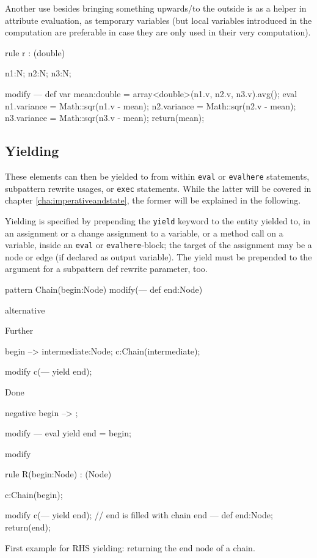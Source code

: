 Another use besides bringing something upwards/to the outside is as a helper in attribute evaluation,
as temporary variables (but local variables introduced in the computation are preferable in case they are only used in their very computation).

\begin{example}
  \begin{grgen}
rule r : (double) {
  n1:N; n2:N; n3:N;
  
  modify {
  ---
    def var mean:double = array<double>(n1.v, n2.v, n3.v).avg();
    eval {
      n1.variance = Math::sqr(n1.v - mean); 
      n2.variance = Math::sqr(n2.v - mean); 
      n3.variance = Math::sqr(n3.v - mean); 
    }
    return(mean);
  }
}
  \end{grgen}
\end{example}

\subsection{Yielding}\label{sub:yield} 

These elements can then be yielded to from within \texttt{eval} or \texttt{evalhere} statements, subpattern rewrite usages, or \texttt{exec} statements.
While the latter will be covered in chapter \ref{cha:imperativeandstate}, the former will be explained in the following.

Yielding is specified by prepending the \texttt{yield} keyword to the entity yielded to,
in an assignment or a change assignment to a variable, or a method call on a variable,
inside an \texttt{eval} or \texttt{evalhere}-block; 
the target of the assignment may be a node or edge (if declared as output variable).
The yield must be prepended to the argument for a subpattern def rewrite parameter, too.

\begin{example}
  \begin{grgen}
pattern Chain(begin:Node) modify(--- def end:Node)
{
  alternative {
    Further {
      begin --> intermediate:Node;
      c:Chain(intermediate);
      
      modify {
        c(--- yield end);
      }
    }
    Done {
      negative {
        begin --> ;
      }
      
      modify {
      ---
        eval {
          yield end = begin;
        }
      }
    }
  }
  
  modify { }
}

rule R(begin:Node) : (Node) {
  c:Chain(begin);

  modify {
    c(--- yield end); // end is filled with chain end
  ---
    def end:Node;
    return(end);
  }
}
  \end{grgen}
  First example for RHS yielding: returning the end node of a chain.
\end{example}

